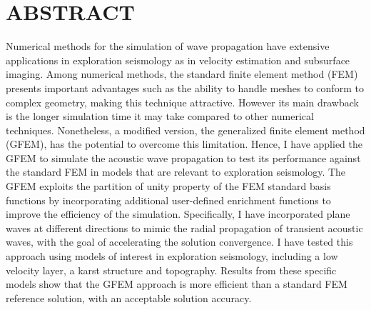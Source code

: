 %
%
%
%

\chapter*{ABSTRACT}

\pagestyle{plain} %
\setcounter{page}{2}

\indent Numerical methods for the simulation of wave propagation have extensive applications in exploration seismology as in velocity estimation and subsurface imaging. Among numerical methods, the standard finite element method (FEM) presents important advantages such as the ability to handle meshes to conform to complex geometry, making this technique attractive. However its main drawback is the longer simulation time it may take compared to other numerical techniques. Nonetheless, a modified version, the generalized finite element method (GFEM), has the potential to overcome this limitation. Hence,
I have applied the GFEM to simulate the acoustic wave propagation to test its performance against the standard FEM in models that are relevant to exploration seismology. The GFEM exploits the partition of unity property of the FEM standard basis functions by incorporating additional user-defined enrichment functions to improve the efficiency of the simulation. Specifically, I have incorporated plane waves at different directions to mimic the radial propagation of transient acoustic waves, with the goal of accelerating the solution convergence. I have tested this approach  using models of interest in  exploration seismology, including a low velocity layer, a karst structure and topography. Results from these specific models show that the GFEM approach is more efficient than a standard FEM reference solution, with an acceptable solution accuracy.

\pagebreak{}
